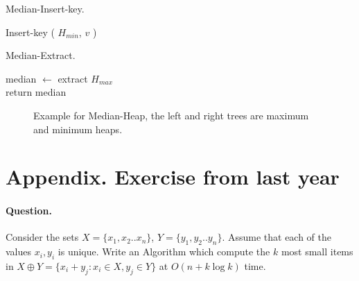 \begin{algbox}{Median-Insert-key.}
\begin{algorithm}[H]  
 {
	 {
       Insert-key ( $H_{min}$, $v$ )
    }
}
\end{algorithm}
\end{algbox}

\begin{algbox}{Median-Extract.}
\begin{algorithm}[H]
median $\leftarrow$ extract $H_{max}$ \\   
return median 
\end{algorithm}
\end{algbox}

\begin{figure}[h]
  \centering
  \begin{subfigure}[b]{0.49\textwidth}
	
  \end{subfigure}
\begin{subfigure}[b]{0.49\textwidth}
	
  \end{subfigure}
  \caption{ Example for Median-Heap, the left and right trees are maximum and minimum heaps.  }
\end{figure}

\iffalse 
  \newpage

\section{ Appendix. Exercise from last year }

\paragraph{Question.} Consider the sets $X = \{x_1,x_2 .. x_n\}$, $Y = \{y_1, y_2 .. y_n\}$. Assume that each of the values $x_i,y_i$ is unique. Write an Algorithm which compute the $k$ most small items in $X \oplus Y = \{ x_{i} + y_{j} : x_{i} \in X , y_{j} \in Y  \} $ at $ O \left( n + k\log k  \right) $ time. 

